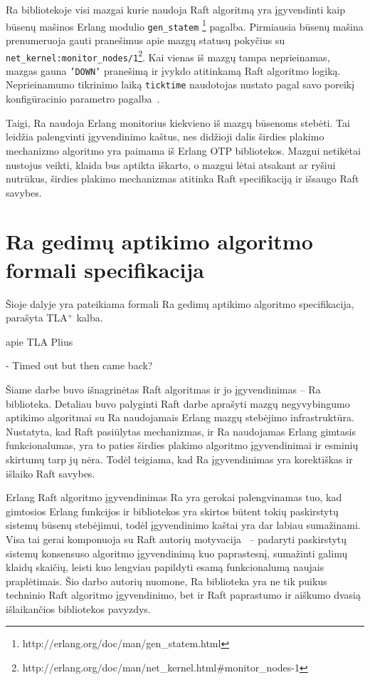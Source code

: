 \documentclass{VUMIFPSkursinis}
\begin{document}
Ra bibliotekoje visi mazgai kurie naudoja Raft algoritmą yra įgyvendinti kaip būsenų mašinos Erlang modulio \texttt{gen\_statem} \footnote{http://erlang.org/doc/man/gen\_statem.html} pagalba. 
Pirmiausia būsenų mašina  prenumeruoja gauti pranešimus apie mazgų statusų pokyčius su \texttt{net\_kernel:monitor\_nodes/1}\footnote{http://erlang.org/doc/man/net\_kernel.html\#monitor\_nodes-1}. Kai vienas iš mazgų tampa neprieinamas, mazgas gauna \texttt{'DOWN'} pranešimą ir įvykdo atitinkamą Raft algoritmo logiką. Neprieinamumo tikrinimo laiką \texttt{ticktime} naudotojas nustato pagal savo poreikį konfigūracinio parametro pagalba~\cite{rabbitmqra}.

Taigi, Ra naudoja Erlang monitorius kiekvieno iš mazgų būsenoms stebėti. Tai leidžia palengvinti įgyvendinimo kaštus, nes didžioji dalis širdies plakimo mechanizmo algoritmo yra paimama iš Erlang OTP bibliotekos. Mazgui netikėtai nustojus veikti, klaida bus aptikta iškarto, o mazgui lėtai atsakant ar ryšiui nutrūkus, širdies plakimo mechanizmas atitinka Raft specifikaciją ir išsaugo Raft savybes.

\section{Ra gedimų aptikimo algoritmo formali specifikacija}

Šioje dalyje yra pateikiama formali Ra gedimų aptikimo algoritmo specifikacija, parašyta TLA$^+$ kalba.

apie TLA Plius

- Timed out but then came back?



Šiame darbe buvo išnagrinėtas Raft algoritmas ir jo įgyvendinimas -- Ra biblioteka. Detaliau buvo palyginti Raft darbe aprašyti mazgų negyvybingumo aptikimo algoritmai su Ra naudojamais Erlang mazgų stebėjimo infrastruktūra. Nustatyta, kad Raft pasiūlytas mechanizmas, ir Ra naudojamas Erlang gimtasis funkcionalumas, yra to paties širdies plakimo algoritmo įgyvendinimai ir esminių skirtumų tarp jų nėra. Todėl teigiama, kad Ra įgyvendinimas yra korektiškas ir išlaiko Raft savybes.

Erlang Raft algoritmo įgyvendinimas Ra yra gerokai palengvinamas tuo, kad gimtosios Erlang funkcijos ir bibliotekos yra skirtos būtent tokių paskirstytų sistemų būsenų stebėjimui, todėl įgyvendinimo kaštai yra dar labiau sumažinami. Visa tai gerai komponuoja su Raft autorių motyvacija~\cite{ongaro_consensus} -- padaryti paskirstytų sistemų konsensuso algoritmo įgyvendinimą kuo paprastesnį, sumažinti galimų klaidų skaičių, leisti kuo lengviau papildyti esamą funkcionalumą naujais praplėtimais. Šio darbo autorių nuomone, Ra biblioteka yra ne tik puikus techninio Raft algoritmo įgyvendinimo, bet ir Raft paprastumo ir aiškumo dvasią išlaikančios bibliotekos pavyzdys. 
\end{document}
